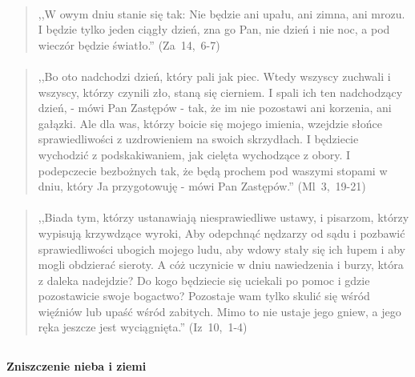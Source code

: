\documentclass[10pt,a4paper,oneside]{article}
\begin{document}
\paragraph{}
\begin{quote}
,,W owym dniu stanie się tak: Nie będzie ani upału, ani zimna, ani mrozu. I będzie tylko jeden ciągły dzień, zna go Pan, nie dzień i nie noc, a pod wieczór będzie światło.'' \mbox{(Za 14, 6-7)}
\end{quote}
\paragraph{}
\begin{quote}
,,Bo oto nadchodzi dzień, który pali jak piec. Wtedy wszyscy zuchwali i wszyscy, którzy czynili zło, staną się cierniem. I spali ich ten nadchodzący dzień, - mówi Pan Zastępów - tak, że im nie pozostawi ani korzenia, ani gałązki. Ale dla was, którzy boicie się mojego imienia, wzejdzie słońce sprawiedliwości z uzdrowieniem na swoich skrzydłach. I będziecie wychodzić z podskakiwaniem, jak cielęta wychodzące z obory. I podepczecie bezbożnych tak, że będą prochem pod waszymi stopami w dniu, który Ja przygotowuję - mówi Pan Zastępów.'' \mbox{(Ml 3, 19-21)}
\end{quote}
\paragraph{}
\begin{quote}
,,Biada tym, którzy ustanawiają niesprawiedliwe ustawy, i pisarzom, którzy wypisują krzywdzące wyroki, Aby odepchnąć nędzarzy od sądu i pozbawić sprawiedliwości ubogich mojego ludu, aby wdowy stały się ich łupem i aby mogli obdzierać sieroty. A cóż uczynicie w dniu nawiedzenia i burzy, która z daleka nadejdzie? Do kogo będziecie się uciekali po pomoc i gdzie pozostawicie swoje bogactwo? Pozostaje wam tylko skulić się wśród więźniów lub upaść wśród zabitych. Mimo to nie ustaje jego gniew, a jego ręka jeszcze jest wyciągnięta.'' \mbox{(Iz 10, 1-4)}
\end{quote}
\subsection*{}
\subsubsection*{}
\paragraph{Zniszczenie nieba i ziemi}
\end{document}
